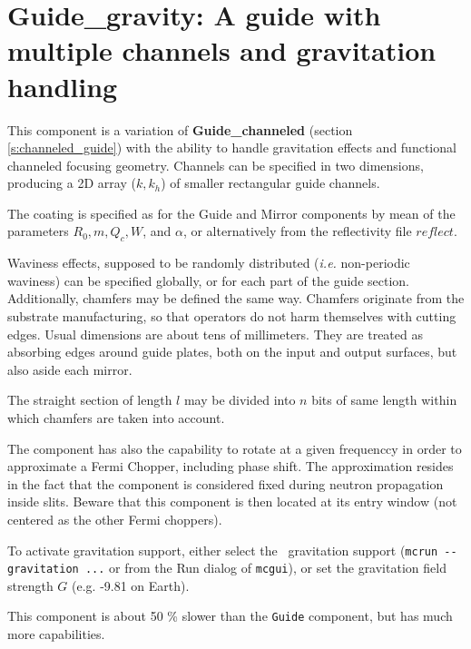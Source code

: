 \section{Guide\_gravity: A guide with multiple channels and gravitation handling}
\label{s:guide_gravity}


This component is a variation of {\bf Guide\_channeled}
(section \ref{s:channeled_guide}) with the ability to handle
gravitation effects and functional channeled focusing geometry.
Channels can be specified in two dimensions,
producing a 2D array ($k, k_h$) of smaller rectangular guide channels.

The coating is specified as for the Guide and Mirror components by mean of the parameters $R_0, m, Q_c, W$, and $\alpha$, or alternatively from the reflectivity file $reflect$.

Waviness effects, supposed to be randomly distributed
(\emph{i.e.} non-periodic waviness)
can be specified globally, or for each part of the guide section.
Additionally, chamfers
may be defined the same way.
Chamfers originate from the substrate manufacturing, so that operators do not harm themselves with cutting edges. Usual dimensions are about tens of millimeters. They are treated as absorbing edges around guide plates, both on the input and output surfaces, but also aside each mirror.

The straight section of length $l$ may be divided into $n$ bits of same length
within which chamfers are taken into account.

The component has also the capability to rotate at a given frequenccy in order to approximate a Fermi Chopper, including phase shift. The approximation resides in the fact that the component is considered fixed during neutron propagation inside slits. Beware that this component is then located at its entry window (not centered as the other Fermi choppers).

To activate gravitation support, either select the \MCS\ gravitation support (\verb+mcrun --gravitation ...+ or from the Run dialog of \verb+mcgui+),
or set the gravitation field strength $G$ (e.g. -9.81 on Earth).

This component is about 50 \% slower than the \verb+Guide+ component, but has much more capabilities.

